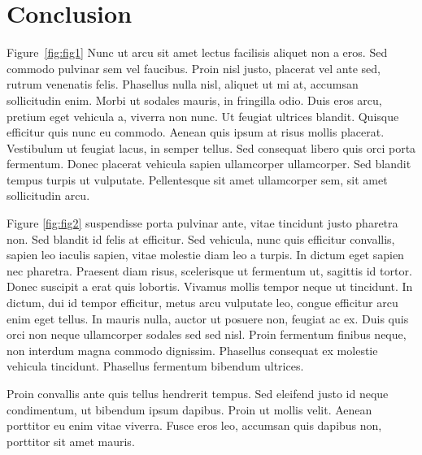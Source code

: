 
\section{Conclusion} Figure~\ref{fig:fig1} Nunc ut arcu sit amet lectus facilisis aliquet non
a eros. Sed commodo pulvinar sem vel faucibus. Proin nisl justo, placerat vel ante sed, rutrum
venenatis felis. Phasellus nulla nisl, aliquet ut mi at, accumsan sollicitudin enim. Morbi ut
sodales mauris, in fringilla odio. Duis eros arcu, pretium eget vehicula a, viverra non nunc.
Ut feugiat ultrices blandit. Quisque efficitur quis nunc eu commodo. Aenean quis ipsum at risus
mollis placerat. Vestibulum ut feugiat lacus, in semper tellus. Sed consequat libero quis orci
porta fermentum. Donec placerat vehicula sapien ullamcorper ullamcorper. Sed blandit tempus
turpis ut vulputate. Pellentesque sit amet ullamcorper sem, sit amet sollicitudin arcu. 

Figure \ref{fig:fig2} suspendisse porta pulvinar ante, vitae tincidunt justo pharetra non. Sed
blandit id felis at efficitur. Sed vehicula, nunc quis efficitur convallis, sapien leo iaculis
sapien, vitae molestie diam leo a turpis. In dictum eget sapien nec pharetra. Praesent diam
risus, scelerisque ut fermentum ut, sagittis id tortor. Donec suscipit a erat quis lobortis.
Vivamus mollis tempor neque ut tincidunt. In dictum, dui id tempor efficitur, metus arcu
vulputate leo, congue efficitur arcu enim eget tellus. In mauris nulla, auctor ut posuere non,
feugiat ac ex. Duis quis orci non neque ullamcorper sodales sed sed nisl. Proin fermentum
finibus neque, non interdum magna commodo dignissim. Phasellus consequat ex molestie vehicula
tincidunt. Phasellus fermentum bibendum ultrices. 

Proin convallis ante quis tellus hendrerit tempus. Sed eleifend justo id
neque condimentum, ut bibendum ipsum dapibus. Proin ut mollis velit. Aenean porttitor eu enim
vitae viverra. Fusce eros leo, accumsan quis dapibus non, porttitor sit amet mauris. 

\endinput

